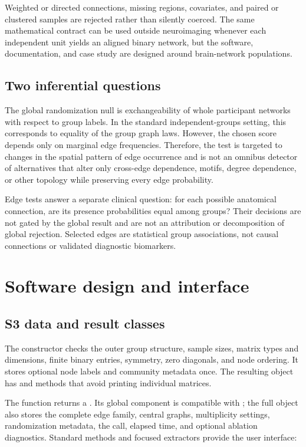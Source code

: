 \documentclass[article]{jss}\usepackage[]{graphicx}\usepackage[]{xcolor}
\newcommand{\class}[1]{\code{#1}}
\begin{document}
Weighted or directed connections, missing regions, covariates, and paired or
clustered samples are rejected rather than silently coerced. The same
mathematical contract can be used outside neuroimaging whenever each
independent unit yields an aligned binary network, but the software,
documentation, and case study are designed around brain-network populations.

\subsection{Two inferential questions}

The global randomization null is exchangeability of whole participant
networks with respect to group labels. In the standard independent-groups
setting, this corresponds to equality of the group graph laws. However, the
chosen score depends only on marginal edge frequencies. Therefore, the test is
targeted to changes in the spatial pattern of edge occurrence and is not an
omnibus detector of alternatives that alter only cross-edge dependence,
motifs, degree dependence, or other topology while preserving every edge
probability.

Edge tests answer a separate clinical question: for each possible anatomical
connection, are its presence probabilities equal among groups? Their decisions
are not gated by the global result and are not an attribution or decomposition
of global rejection. Selected edges are statistical group associations, not
causal connections or validated diagnostic biomarkers.

\section[Software design and R interface]{Software design and
   interface}
\label{sec:design}

\subsection{S3 data and result classes}

The  constructor checks the outer group structure,
sample sizes, matrix types and dimensions, finite binary entries, symmetry,
zero diagonals, and node ordering. It stores optional node labels and
community metadata once. The resulting \class{brainnet\_data} object has
 and  methods that avoid printing individual
matrices.

The  function returns a
\class{brainnet\_result}. Its
global component is compatible with \class{htest}; the full object also stores
the complete edge family, central graphs, multiplicity settings, randomization
metadata, the call, elapsed time, and optional ablation diagnostics. Standard
methods and focused extractors provide the user interface:
\end{document}
